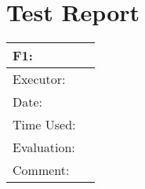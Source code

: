 \section{Test Report}
\label{testreport}
\begin{tabular}{|m{}|m{}|}
\hline
F1: \\ \hline
Executor: & \\ \hline
Date: & \\ \hline
Time Used: & \\ \hline
Evaluation: & \\ \hline
Comment: & \\ \hline
\end{tabular}